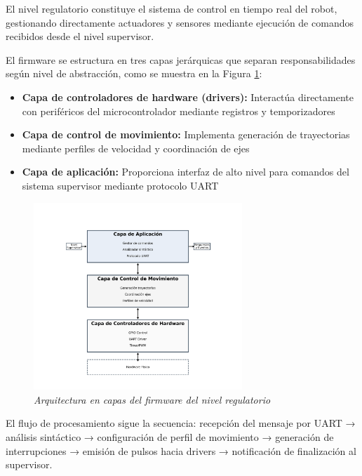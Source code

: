 El nivel regulatorio constituye el sistema de control en tiempo real del robot, gestionando directamente actuadores y sensores mediante ejecución de comandos recibidos desde el nivel supervisor.

El firmware se estructura en tres capas jerárquicas que separan responsabilidades según nivel de abstracción, como se muestra en la Figura \ref{fig:arquitectura_regulatorio}:

\begin{itemize}[label=$\bullet$]
\item \textbf{Capa de controladores de hardware (drivers):} Interactúa directamente con periféricos del microcontrolador mediante registros y temporizadores
\item \textbf{Capa de control de movimiento:} Implementa generación de trayectorias mediante perfiles de velocidad y coordinación de ejes
\item \textbf{Capa de aplicación:} Proporciona interfaz de alto nivel para comandos del sistema supervisor mediante protocolo UART
\end{itemize}

\begin{figure}[H]
    \centering
    \includegraphics[width=0.7\textwidth]{imagenes/arquitectura_regulatorio_capas.png}
    \caption{\textit{Arquitectura en capas del firmware del nivel regulatorio}}
    \label{fig:arquitectura_regulatorio}
\end{figure}

El flujo de procesamiento sigue la secuencia: recepción del mensaje por UART → análisis sintáctico → configuración de perfil de movimiento → generación de interrupciones → emisión de pulsos hacia drivers → notificación de finalización al supervisor.
